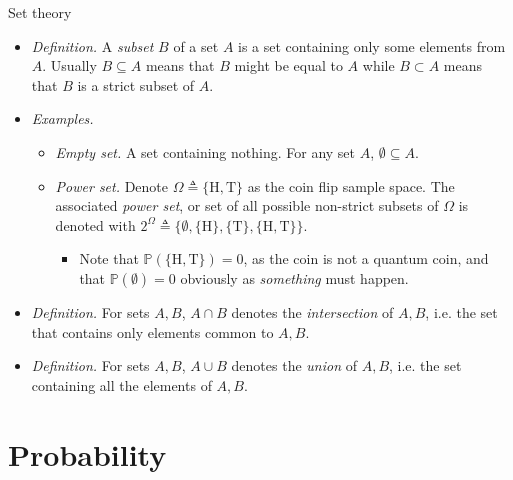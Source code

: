 \documentclass{beamer}
\begin{document}
\begin{frame}{Set theory}
    \begin{itemize}
        \item
        \textit{Definition.} A \textit{subset} $ B $ of a set $ A $ is a set
        containing only some elements from $ A $. Usually $ B \subseteq A $
        means that $ B $ might be equal to $ A $ while $ B \subset A $ means
        that $ B $ is a strict subset of $ A $.

        \item
        \textit{Examples.}
        \begin{itemize}
            \item
            \textit{Empty set.} A set containing nothing. For any set $ A $,
            $ \emptyset \subseteq A $.

            \item
            \textit{Power set.} Denote $ \Omega \triangleq \{\text{H},
            \text{T}\} $ as the coin flip sample space. The associated
            \textit{power set}, or set of all possible non-strict subsets of
            $ \Omega $ is denoted with $ 2^\Omega \triangleq \{\emptyset,
            \{\text{H}\}, \{\text{T}\}, \{\text{H}, \text{T}\}\} $.
            \begin{itemize}
                \item
                Note that $ \mathbb{P}(\{\text{H}, \text{T}\}) = 0 $, as the
                coin is not a quantum coin, and that $ \mathbb{P}(\emptyset)
                = 0 $ obviously as \textit{something} must happen.
            \end{itemize}
        \end{itemize}

        \item
        \textit{Definition.} For sets $ A, B $, $ A \cap B $ denotes the 
        \textit{intersection} of $ A, B $, i.e. the set that contains only
        elements common to $ A, B $.

        \item
        \textit{Definition.} For sets $ A, B $, $ A \cup B $ denotes the
        \textit{union} of $ A, B $, i.e. the set containing all the elements
        of $ A, B $.
    \end{itemize}
\end{frame}

\section{Probability}
\end{document}
